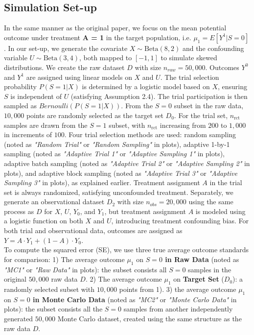 \documentclass[12pt, oneside]{amsart}
\theoremstyle{definition}
\theoremstyle{remark}
\numberwithin{equation}{section}
\begin{document}
\subsection{Simulation Set-up}
In the same manner as the original paper, we focus on the mean potential outcome under treatment \textbf{A = 1} in the target population, i.e. ${\mu_1} = E[Y^1 |S= 0]$. In our set-up, we generate the covariate $X \sim \text{Beta}(8,2)$ and the confounding variable $U \sim \text{Beta}(3,4)$, both mapped to $[-1, 1]$ to simulate skewed distributions. We create the raw dataset $D$ with size $n_{raw}=50,000$.  Outcomes $Y^0$ and $Y^1$ are assigned using linear models on $X$ and $U$. The trial selection probability $P(S=1|X)$ is determined by a logistic model based on $X$, ensuring $S$ is independent of $U$ (satisfying Assumption 2.4). The trial participation is then sampled as $Bernoulli(P(S=1|X))$. From the $S=0$ subset in the raw data, $10,000$ points are randomly selected as the target set $D_0$. For the trial set, $n_{\text{rct}}$ samples are drawn from the $S=1$ subset, with $n_{\text{rct}}$ increasing from $200$ to $1,000$ in increments of $100$. Four trial selection methods are used: random sampling (noted as \textit{"Random Trial"} or \textit{"Random Sampling"} in plots), adaptive 1-by-1 sampling (noted as \textit{"Adaptive Trial 1"} or \textit{"Adaptive Sampling 1"} in plots), adaptive batch sampling (noted as \textit{"Adaptive Trial 2"} or \textit{"Adaptive Sampling 2"} in plots), and adaptive block sampling (noted as \textit{"Adaptive Trial 3"} or \textit{"Adaptive Sampling 3"} in plots), as explained earlier. Treatment assignment $A$ in the trial set is always randomized, satisfying unconfounded treatment. Separately, we generate an observational dataset $D_2$ with size $n_{obs} =20,000$ using the same process as $D$ for $X$, $U$, $Y_0$, and $Y_1$, but treatment assignment $A$ is modeled using a logistic function on both $X$ and $U$, introducing treatment confounding bias. For both trial and observational data, outcomes are assigned as $Y = A \cdot Y_1 + (1 - A) \cdot Y_0$.\\

 To compute the squared error (SE), we use three true average outcome standards for comparison: 1) The average outcome $\mu_1$ on \textbf{$S=0$ in Raw Data} (noted as \textit{"MC1"} or \textit{"Raw Data"} in plots): the subset consists all $S=0$ samples in the original $50,000$ raw data $D$. 2) The average outcome $\mu_1$ on \textbf{Target Set} ($D_0$): a randomly selected subset with $10,000$ points from 1). 3) the average outcome $\mu_1$ on \textbf{$S=0$ in Monte Carlo Data} (noted as \textit{"MC2"} or \textit{"Monte Carlo Data"} in plots): the subset consists all the $S=0$ samples from another independently generated $50,000$ Monte Carlo dataset, created using the same structure as the raw data $D$.\\
\end{document}
